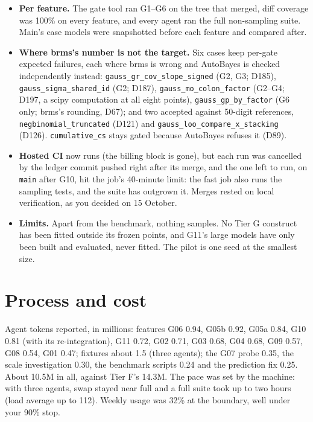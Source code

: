 \documentclass[11pt]{article}
\newcommand{\code}[1]{\texttt{#1}}
\begin{document}
\begin{itemize}
\item \textbf{Per feature.} The gate tool ran G1--G6 on the tree that merged, diff coverage was 100\% on every feature, and
  every agent ran the full non-sampling suite. Main's case models were snapshotted before each feature and compared after.
\item \textbf{Where brms's number is not the target.} Six cases keep per-gate expected failures, each where brms is wrong
  and AutoBayes is checked independently instead:
  \code{gauss\_gr\_cov\_slope\_signed} (G2, G3; D185), \code{gauss\_sigma\_shared\_id} (G2; D187),
  \code{gauss\_mo\_colon\_factor} (G2--G4; D197, a scipy computation at all eight points), \code{gauss\_gp\_by\_factor} (G6
  only; brms's rounding, D67); and two accepted against 50-digit references, \code{negbinomial\_truncated} (D121) and
  \code{gauss\_loo\_compare\_x\_stacking} (D126). \code{cumulative\_cs} stays gated because AutoBayes refuses it (D89).
\item \textbf{Hosted CI} now runs (the billing block is gone), but each run was cancelled by the ledger commit pushed right
  after its merge, and the one left to run, on \code{main} after G10, hit the job's 40-minute limit: the fast job also
  runs the sampling tests, and the suite has outgrown it. Merges rested on local verification, as you decided on 15
  October.
\item \textbf{Limits.} Apart from the benchmark, nothing samples. No Tier G construct has been fitted outside its frozen
  points, and G11's large models have only been built and evaluated, never fitted. The pilot is one seed at the smallest
  size.
\end{itemize}

\section{Process and cost}

Agent tokens reported, in millions: features G06 0.94, G05b 0.92, G05a 0.84, G10 0.81 (with its re-integration), G11 0.72,
G02 0.71, G03 0.68, G04 0.68, G09 0.57, G08 0.54, G01 0.47; fixtures about 1.5 (three agents); the G07 probe 0.35, the scale
investigation 0.30, the benchmark scripts 0.24 and the prediction fix 0.25. About 10.5M in all, against Tier F's 14.3M. The
pace was set by the machine: with three agents, swap stayed near full and a full suite took up to two hours (load average
up to 112). Weekly usage was 32\% at the boundary, well under your 90\% stop.
\end{document}
